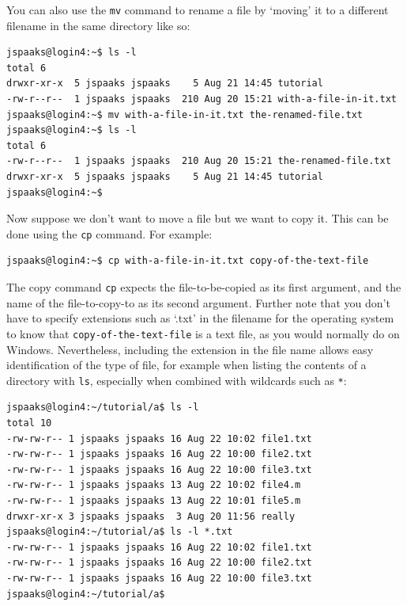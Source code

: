 You can also use the \lstinline[style=bashinline]{mv} command to rename a file by `moving' it to a different filename in the same directory like so:
\begin{lstlisting}[style=basic,style=bash]
jspaaks@login4:~$ ls -l
total 6
drwxr-xr-x  5 jspaaks jspaaks    5 Aug 21 14:45 tutorial
-rw-r--r--  1 jspaaks jspaaks  210 Aug 20 15:21 with-a-file-in-it.txt
jspaaks@login4:~$ mv with-a-file-in-it.txt the-renamed-file.txt 
jspaaks@login4:~$ ls -l
total 6
-rw-r--r--  1 jspaaks jspaaks  210 Aug 20 15:21 the-renamed-file.txt
drwxr-xr-x  5 jspaaks jspaaks    5 Aug 21 14:45 tutorial
jspaaks@login4:~$ 
\end{lstlisting}


Now suppose we don't want to move a file but we want to copy it. This can be done using the \lstinline[style=bashinline]{cp} command. For example:
\begin{lstlisting}[style=basic,style=bash]
jspaaks@login4:~$ cp with-a-file-in-it.txt copy-of-the-text-file 
\end{lstlisting}
The copy command \lstinline[style=bashinline]{cp} expects the file-to-be-copied as its first argument, and the name of the file-to-copy-to as its second argument. Further note that you don't have to specify extensions such as `.txt' in the filename for the operating system to know that \lstinline[style=bashinline]{copy-of-the-text-file} is a text file, as you would normally do on Windows. Nevertheless, including the extension in the file name allows easy identification of the type of file, for example when listing the contents of a directory with \lstinline[style=bashinline]{ls}, especially when combined with wildcards such as \lstinline[style=bashinline]{*}:

\begin{lstlisting}[style=basic,style=bash]
jspaaks@login4:~/tutorial/a$ ls -l
total 10
-rw-rw-r-- 1 jspaaks jspaaks 16 Aug 22 10:02 file1.txt
-rw-rw-r-- 1 jspaaks jspaaks 16 Aug 22 10:00 file2.txt
-rw-rw-r-- 1 jspaaks jspaaks 16 Aug 22 10:00 file3.txt
-rw-rw-r-- 1 jspaaks jspaaks 13 Aug 22 10:02 file4.m
-rw-rw-r-- 1 jspaaks jspaaks 13 Aug 22 10:01 file5.m
drwxr-xr-x 3 jspaaks jspaaks  3 Aug 20 11:56 really
jspaaks@login4:~/tutorial/a$ ls -l *.txt
-rw-rw-r-- 1 jspaaks jspaaks 16 Aug 22 10:02 file1.txt
-rw-rw-r-- 1 jspaaks jspaaks 16 Aug 22 10:00 file2.txt
-rw-rw-r-- 1 jspaaks jspaaks 16 Aug 22 10:00 file3.txt
jspaaks@login4:~/tutorial/a$ 
\end{lstlisting}


